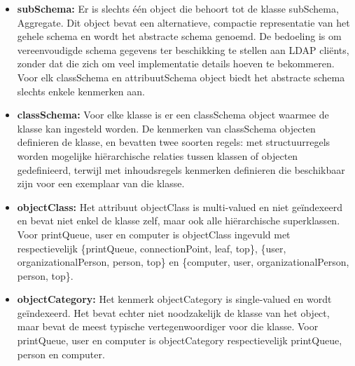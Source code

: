 \begin{enumerate}
		 {
			\begin{itemize}
				\item \textbf{subSchema:} Er is slechts één object die behoort tot de klasse subSchema, Aggregate. Dit object bevat een alternatieve, compactie representatie van het gehele schema en wordt het abstracte schema genoemd. De bedoeling is om vereenvoudigde schema gegevens ter beschikking te stellen aan LDAP cliënts, zonder dat die zich om veel implementatie details hoeven te bekommeren. Voor elk classSchema en attribuutSchema object biedt het abstracte schema slechts enkele kenmerken aan. 
				\item \textbf{classSchema:} Voor elke klasse is er een classSchema object waarmee de klasse kan ingesteld worden. De kenmerken van classSchema objecten definieren de klasse, en bevatten twee soorten regels: met structuurregels worden mogelijke hiërarchische relaties tussen klassen of objecten gedefinieerd, terwijl met inhoudsregels kenmerken definieren die beschikbaar zijn voor een exemplaar van die klasse.
			\end{itemize}
		}
		
		 { 
			\begin{itemize}
				\item \textbf{objectClass:} Het attribuut objectClass is multi-valued en niet geïndexeerd en bevat niet enkel de klasse zelf, maar ook alle hiërarchische superklassen. Voor printQueue, user en computer is objectClass ingevuld met respectievelijk \{printQueue, connectionPoint, leaf, top\}, \{user, organizationalPerson, person, top\} en \{computer, user, organizationalPerson, person, top\}. 
				\item  \textbf{objectCategory:} Het kenmerk objectCategory is single-valued en wordt geïndexeerd. Het bevat echter niet noodzakelijk de klasse van het object, maar bevat de meest typische vertegenwoordiger voor die klasse. Voor printQueue, user en computer is objectCategory respectievelijk printQueue, person en computer.
			\end{itemize}	
		}
	\end{enumerate}
	
